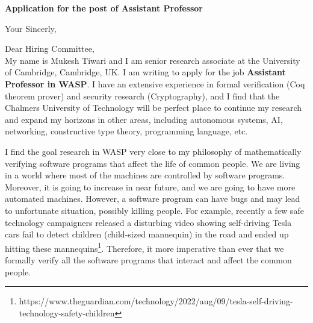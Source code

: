 \documentclass[11pt,a4paper,roman]{moderncv}
\begin{document}
\date{}
\opening{\textbf{Application for the post of Assistant Professor}}
\closing{Your Sincerly, \vspace{-1em}}



\makelettertitle


Dear Hiring Committee, 
\\
\vspace{1em}
My name is Mukesh Tiwari and  I am senior research associate at 
the University of Cambridge, Cambridge, UK. 
I am writing to apply
for the job \textbf{Assistant Professor in WASP}. I have an extensive experience in
formal verification (Coq theorem prover) and security research (Cryptography), and I find that the 
Chalmers University of Technology will be  
perfect place to continue my research and expand my horizons in other areas,  
including autonomous systems, AI, networking, constructive type theory, programming 
language, etc.  



\vspace{0.5cm}
I find the goal research in WASP very close to my philosophy of 
mathematically verifying software programs that affect the life of common people. 
We are living in a world where most of the machines are 
controlled by software programs. Moreover, 
it is going to increase in near future, and we 
are going to have more automated machines. However, 
a software program can have bugs and may lead 
to unfortunate situation, possibly killing people. 
For example, recently a few safe technology campaigners
released a disturbing video  
showing self-driving Tesla cars fail to detect 
children (child-sized mannequin) in the road and ended up hitting 
these mannequins\footnote{https://www.theguardian.com/technology/2022/aug/09/tesla-self-driving-technology-safety-children}.
Therefore, it more imperative than ever  that  we formally verify 
all the software programs that interact and affect the common people. 
\end{document}
